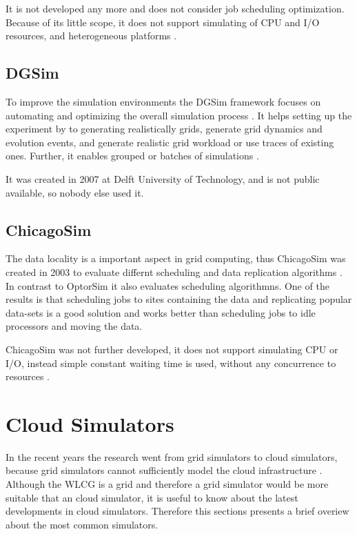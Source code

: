 It is not developed any more and does not consider job scheduling optimization. Because of its little scope, it does not support simulating of CPU and I/O resources, and heterogeneous platforms \cite{optorsim}.


\subsection{DGSim}
To improve the simulation environments the DGSim framework focuses on automating and optimizing the overall simulation process \cite{dgsim}. It helps setting up the experiment by to generating realistically grids, generate grid dynamics and evolution events, and generate realistic grid workload or use traces of existing ones. Further, it enables grouped or batches of simulations \cite{dgsim}.

It was created in 2007 at Delft University of Technology, and is not public available, so nobody else used it.


\subsection{ChicagoSim}
The data locality is a important aspect in grid computing, thus ChicagoSim was created in 2003 to evaluate differnt scheduling and data replication algorithms \cite{chicagosim}. In contrast to OptorSim it also evaluates scheduling algorithmns. 
One of the results is that scheduling jobs to sites containing the data and replicating popular data-sets is a good solution and works better than scheduling jobs to idle processors and moving the data.

ChicagoSim was not further developed, it does not support simulating CPU or I/O, instead simple constant waiting time is used, without any concurrence to resources \cite{chicagosim}. 



\section{Cloud Simulators}
In the recent years the research went from grid simulators to cloud simulators, because grid simulators cannot sufficiently model the cloud infrastructure \cite{compare_grid_cloud}. Although the WLCG is a grid and therefore a grid simulator would be more suitable that an cloud simulator, it is useful to know about the latest developments in cloud simulators. Therefore this sections presents a brief overiew about the most common simulators.

